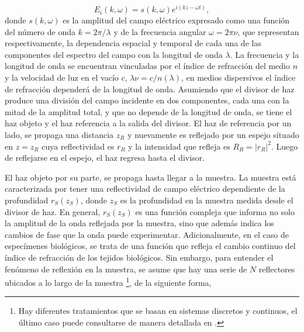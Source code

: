 \begin{equation}
E_i(k,\omega) = s(k,\omega) e^{i(kz - \omega t)},
\end{equation}
donde $s(k,\omega)$ es la amplitud del campo eléctrico expresado como una función del número de onda $k = 2\pi /\lambda$ y de la frecuencia angular $\omega = 2\pi \nu$, que representan respectivamente, la dependencia espacial y temporal de cada una de las componentes del espectro del campo con la longitud de onda $\lambda$. La frecuencia y la longitud de onda se encuentran vinculadas por el índice de refracción del medio $n$ y la velocidad de luz en el vacío $c$, $\lambda \nu = c / n(\lambda)$, en medios dispersivos el índice de refracción dependerá de la longitud de onda. Asumiendo que el divisor de haz produce una división del campo incidente en dos componentes, cada una con la mitad de la amplitud total, y que no depende de la longitud de onda, se tiene el haz objeto y el haz referencia a la salida del divisor. El haz de referencia por un lado, se propaga una distancia $z_R$ y nuevamente es reflejado por un espejo situado en $z = z_R$ cuya reflectividad es $r_R$ y la intensidad que refleja es $R_R = \lvert r_R \rvert^2$. Luego de reflejarse en el espejo, el haz regresa hasta el divisor.

El haz objeto por su parte, se propaga hasta llegar a la muestra. La muestra está caracterizada por tener una reflectividad de campo eléctrico dependiente de la profundidad $r_S(z_S)$, donde $z_S$ es la profundidad en la muestra medida desde el divisor de haz. En general, $r_S(z_S)$ es una función compleja que informa no solo la amplitud de la onda reflejada por la muestra, sino que además indica los cambios de fase que la onda puede experimentar. Adicionalmente, en el caso de especímenes biológicos, se trata de una función que refleja el cambio continuo del índice de refracción de los tejidos biológicos. Sin embargo, para entender el fenómeno de reflexión en la muestra, se asume que hay una serie de $N$ reflectores ubicados a lo largo de la muestra \footnote{Hay diferentes tratamientos que se basan en sistemas discretos y continuos, el último caso puede consultarse de manera detallada en \cite{Brezinski2005,Fercher}.}, de la siguiente forma, 

